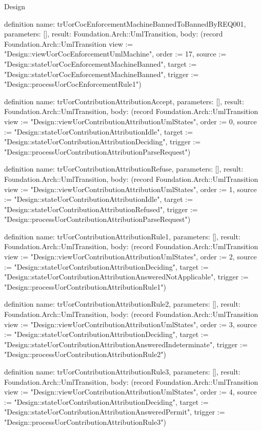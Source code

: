 \begin{lexlean}{Design}
\begin{semanticmodule}
definition{
  name: trUorCocEnforcementMachineBannedToBannedByREQ001,
  parameters: [],
  result: Foundation.Arch::UmlTransition,
  body: (record Foundation.Arch::UmlTransition {view := "Design::viewUorCocEnforcementUmlMachine", order := 17, source := "Design::stateUorCocEnforcementMachineBanned", target := "Design::stateUorCocEnforcementMachineBanned", trigger := "Design::processUorCocEnforcementRule1"})
}

definition{
  name: trUorContributionAttributionAccept,
  parameters: [],
  result: Foundation.Arch::UmlTransition,
  body: (record Foundation.Arch::UmlTransition {view := "Design::viewUorContributionAttributionUmlStates", order := 0, source := "Design::stateUorContributionAttributionIdle", target := "Design::stateUorContributionAttributionDeciding", trigger := "Design::processUorContributionAttributionParseRequest"})
}

definition{
  name: trUorContributionAttributionRefuse,
  parameters: [],
  result: Foundation.Arch::UmlTransition,
  body: (record Foundation.Arch::UmlTransition {view := "Design::viewUorContributionAttributionUmlStates", order := 1, source := "Design::stateUorContributionAttributionIdle", target := "Design::stateUorContributionAttributionRefused", trigger := "Design::processUorContributionAttributionParseRequest"})
}

definition{
  name: trUorContributionAttributionRule1,
  parameters: [],
  result: Foundation.Arch::UmlTransition,
  body: (record Foundation.Arch::UmlTransition {view := "Design::viewUorContributionAttributionUmlStates", order := 2, source := "Design::stateUorContributionAttributionDeciding", target := "Design::stateUorContributionAttributionAnsweredNotApplicable", trigger := "Design::processUorContributionAttributionRule1"})
}

definition{
  name: trUorContributionAttributionRule2,
  parameters: [],
  result: Foundation.Arch::UmlTransition,
  body: (record Foundation.Arch::UmlTransition {view := "Design::viewUorContributionAttributionUmlStates", order := 3, source := "Design::stateUorContributionAttributionDeciding", target := "Design::stateUorContributionAttributionAnsweredIndeterminate", trigger := "Design::processUorContributionAttributionRule2"})
}

definition{
  name: trUorContributionAttributionRule3,
  parameters: [],
  result: Foundation.Arch::UmlTransition,
  body: (record Foundation.Arch::UmlTransition {view := "Design::viewUorContributionAttributionUmlStates", order := 4, source := "Design::stateUorContributionAttributionDeciding", target := "Design::stateUorContributionAttributionAnsweredPermit", trigger := "Design::processUorContributionAttributionRule3"})
}


\end{semanticmodule}
\end{lexlean}
